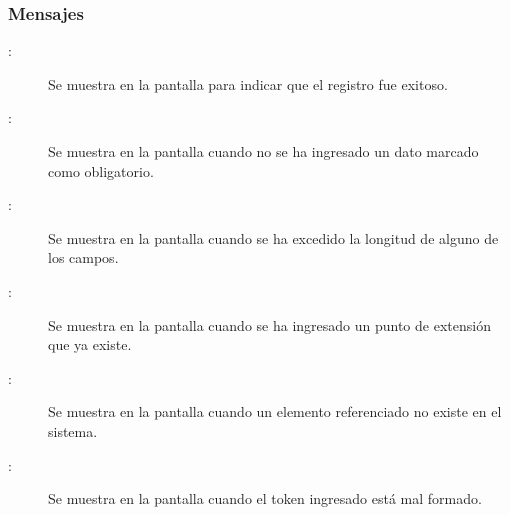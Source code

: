\subsubsection{Mensajes}

	
\begin{description}
	\item[ :] Se muestra en la pantalla  para indicar que el registro fue exitoso.
	\item[ :] Se muestra en la pantalla  cuando no se ha ingresado un dato marcado como obligatorio.
	\item[ :] Se muestra en la pantalla  cuando se ha excedido la longitud de alguno de los campos.
	\item[:] Se muestra en la pantalla  cuando se ha ingresado un punto de extensión que ya existe.
	\item[:] Se muestra en la pantalla  cuando un elemento referenciado no existe en el sistema.
	\item[:] Se muestra en la pantalla  cuando el token ingresado está mal formado.
\end{description}

